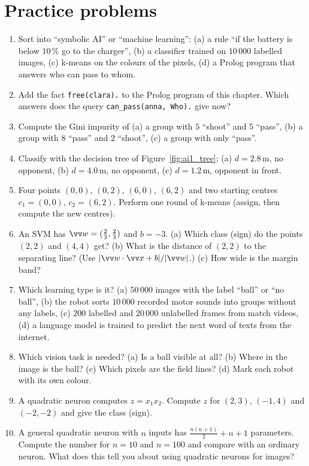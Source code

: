 \section*{Practice problems}
\begin{enumerate}[label=\textbf{\thechapter.\arabic*}]
  \item Sort into ``symbolic AI'' or ``machine learning'': (a) a rule ``if the battery is below $10\,\%$ go to the charger'', (b) a classifier trained on $10\,000$ labelled images, (c) k-means on the colours of the pixels, (d) a Prolog program that answers who can pass to whom.
  \item Add the fact \texttt{free(clara).} to the Prolog program of this chapter. Which answers does the query \texttt{can\_pass(anna, Who).} give now?
  \item Compute the Gini impurity of (a) a group with $5$ ``shoot'' and $5$ ``pass'', (b) a group with $8$ ``pass'' and $2$ ``shoot'', (c) a group with only ``pass''.
  \item Classify with the decision tree of Figure~\ref{fig:ai1_tree}: (a) $d=2.8$\,m, no opponent, (b) $d=4.0$\,m, no opponent, (c) $d=1.2$\,m, opponent in front.
  \item Four points $(0,0)$, $(0,2)$, $(6,0)$, $(6,2)$ and two starting centres $c_1=(0,0)$, $c_2=(6,2)$. Perform one round of k-means (assign, then compute the new centres).
  \item An SVM has $\vv w=(\frac23,\frac23)$ and $b=-3$. (a) Which class (sign) do the points $(2,2)$ and $(4,4)$ get? (b) What is the distance of $(2,2)$ to the separating line? (Use $|\vv w\cdot\vv x+b|/|\vv w|$.) (c) How wide is the margin band?
  \item Which learning type is it? (a) $50\,000$ images with the label ``ball'' or ``no ball'', (b) the robot sorts $10\,000$ recorded motor sounds into groups without any labels, (c) $200$ labelled and $20\,000$ unlabelled frames from match videos, (d) a language model is trained to predict the next word of texts from the internet.
  \item Which vision task is needed? (a) Is a ball visible at all? (b) Where in the image is the ball? (c) Which pixels are the field lines? (d) Mark each robot with its own colour.
  \item A quadratic neuron computes $z=x_1x_2$. Compute $z$ for $(2,3)$, $(-1,4)$ and $(-2,-2)$ and give the class (sign).
  \item[\textbf{\thechapter.10}$\star$] A general quadratic neuron with $n$ inputs has $\frac{n(n+1)}{2}+n+1$ parameters. Compute the number for $n=10$ and $n=100$ and compare with an ordinary neuron. What does this tell you about using quadratic neurons for images?
\end{enumerate}
